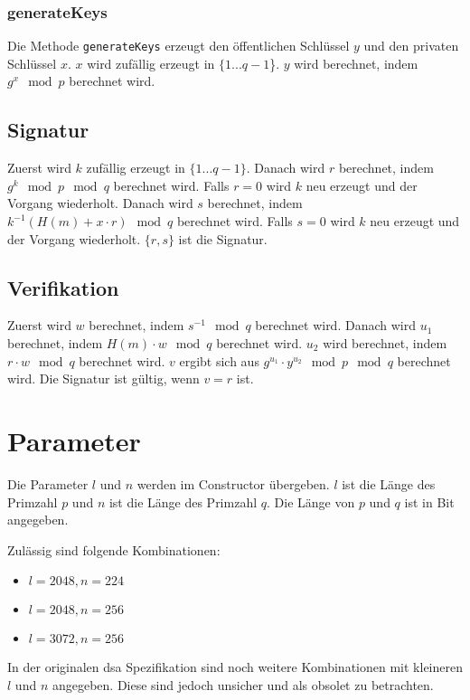 \subsubsection{generateKeys}
Die Methode \texttt{generateKeys} erzeugt den öffentlichen Schlüssel $y$ und den privaten Schlüssel $x$. $x$ wird zufällig erzeugt in $\{1 ... q-1$\}. $y$ wird berechnet, indem $g^x \mod p$ berechnet wird.

\subsection{Signatur}
Zuerst wird $k$ zufällig erzeugt in $\{1 ... q-1\}$. Danach wird $r$ berechnet, indem $g^k \mod p \mod q$ berechnet wird. Falls $r = 0$ wird $k$ neu erzeugt und der Vorgang wiederholt. Danach wird $s$ berechnet, indem $k^{-1} (H(m) + x \cdot r) \mod q$ berechnet wird. Falls $s = 0$ wird $k$ neu erzeugt und der Vorgang wiederholt. $\{ r , s \}$ ist die Signatur.

\subsection{Verifikation}
Zuerst wird $w$ berechnet, indem $s^{-1} \mod q$ berechnet wird. Danach wird $u_1$ berechnet, indem $H(m) \cdot w \mod q$ berechnet wird. $u_2$ wird berechnet, indem $r \cdot w \mod q$ berechnet wird. $v$ ergibt sich aus $g^{u_1} \cdot y^{u_2} \mod p \mod q$ berechnet wird. Die Signatur ist gültig, wenn $v = r$ ist.

\section{Parameter}
Die Parameter $l$ und $n$ werden im Constructor übergeben. $l$ ist die Länge des Primzahl $p$ und $n$ ist die Länge des Primzahl $q$. Die Länge von $p$ und $q$ ist in Bit angegeben.

Zulässig sind folgende Kombinationen:
\begin{itemize}
    \item $l = 2048, n = 224$
    \item $l = 2048, n = 256$
    \item $l = 3072, n = 256$
\end{itemize}

In der originalen \gls{dsa} Spezifikation sind noch weitere Kombinationen mit kleineren $l$ und $n$ angegeben. Diese sind jedoch unsicher und als obsolet zu betrachten.

